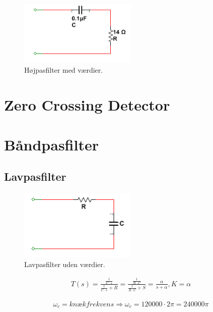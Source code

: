 \begin{figure}[htbp]
	\centering
	\includegraphics[width=0.50\textwidth]{billeder/HWdesign/HP_MV.png}
	\caption{Højpasfilter med værdier.}
	\label{fig:HP_MV}
\end{figure}

\newpage

\section{Zero Crossing Detector}

\newpage

\section{Båndpasfilter}

\subsection{Lavpasfilter}

\begin{figure}[htbp]
	\centering
	\includegraphics[width=0.50\textwidth]{billeder/HWdesign/LP_UV.png}
	\caption{Lavpasfilter uden værdier.}
	\label{fig:LP_UV}
\end{figure}


\begin{align}
\label{eq: LP_networkfunction}T(s) = \frac{\frac{1}{C \cdot s}}{\frac{1}{C \cdot s} + R} = \frac{\frac{1}{R \cdot C}}{\frac{1}{R \cdot C}+S}  = \frac{\alpha}{s + \alpha} , K= \alpha
\end{align}

\begin{align}
	\omega_c = knækfrekvens \Rightarrow \omega_c = 120000 \cdot 2 \pi = 240000\pi 
\end{align} 


